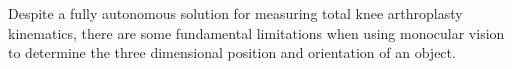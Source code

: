 Despite a fully autonomous solution for measuring total knee arthroplasty kinematics, there are some fundamental limitations when using monocular vision to determine the three dimensional position and orientation of an object.